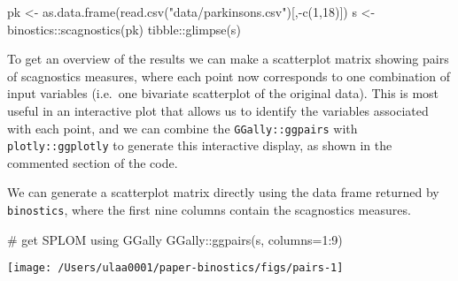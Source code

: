 \begin{Schunk}
\begin{Sinput}
pk <- as.data.frame(read.csv("data/parkinsons.csv")[,-c(1,18)])
s <- binostics::scagnostics(pk)
tibble::glimpse(s)
\end{Sinput}
\end{Schunk}

To get an overview of the results we can make a scatterplot matrix
showing pairs of scagnostics measures, where each point now corresponds
to one combination of input variables (i.e.~one bivariate scatterplot of
the original data). This is most useful in an interactive plot that
allows us to identify the variables associated with each point, and we
can combine the \texttt{GGally::ggpairs} with \texttt{plotly::ggplotly}
to generate this interactive display, as shown in the commented section
of the code.

We can generate a scatterplot matrix directly using the data frame
returned by \texttt{binostics}, where the first nine columns contain the
scagnostics measures.

\begin{Schunk}
\begin{Sinput}
# get SPLOM using GGally
GGally::ggpairs(s, columns=1:9)
\end{Sinput}


\begin{center}\texttt{[image: /Users/ulaa0001/paper-binostics/figs/pairs-1]} \end{center}

\end{Schunk}

